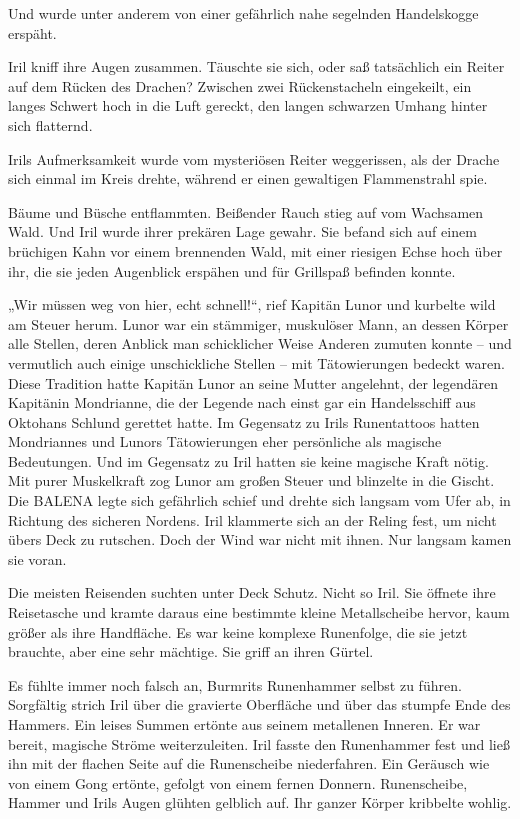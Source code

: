 Und wurde unter anderem von einer gefährlich nahe segelnden Handelskogge erspäht.

Iril kniff ihre Augen zusammen. Täuschte sie sich, oder saß tatsächlich ein Reiter auf dem Rücken des Drachen? Zwischen zwei Rückenstacheln eingekeilt, ein langes Schwert hoch in die Luft gereckt, den langen schwarzen Umhang hinter sich flatternd.

Irils Aufmerksamkeit wurde vom mysteriösen Reiter weggerissen, als der Drache sich einmal im Kreis drehte, während er einen gewaltigen Flammenstrahl spie.

Bäume und Büsche entflammten. Beißender Rauch stieg auf vom Wachsamen Wald. Und Iril wurde ihrer prekären Lage gewahr. Sie befand sich auf einem brüchigen Kahn vor einem brennenden Wald, mit einer riesigen Echse hoch über ihr, die sie jeden Augenblick erspähen und für Grillspaß befinden konnte.

„Wir müssen weg von hier, echt schnell!“, rief Kapitän Lunor und kurbelte wild am Steuer herum. Lunor war ein stämmiger, muskulöser Mann, an dessen Körper alle Stellen, deren Anblick man schicklicher Weise Anderen zumuten konnte – und vermutlich auch einige unschickliche Stellen – mit Tätowierungen bedeckt waren. Diese Tradition hatte Kapitän Lunor an seine Mutter angelehnt, der legendären Kapitänin Mondrianne, die der Legende nach einst gar ein Handelsschiff aus Oktohans Schlund gerettet hatte. Im Gegensatz zu Irils Runentattoos hatten Mondriannes und Lunors Tätowierungen eher persönliche als magische Bedeutungen. Und im Gegensatz zu Iril hatten sie keine magische Kraft nötig. Mit purer Muskelkraft zog Lunor am großen Steuer und blinzelte in die Gischt. Die BALENA legte sich gefährlich schief und drehte sich langsam vom Ufer ab, in Richtung des sicheren Nordens. Iril klammerte sich an der Reling fest, um nicht übers Deck zu rutschen. Doch der Wind war nicht mit ihnen. Nur langsam kamen sie voran.

Die meisten Reisenden suchten unter Deck Schutz. Nicht so Iril. Sie öffnete ihre Reisetasche und kramte daraus eine bestimmte kleine Metallscheibe hervor, kaum größer als ihre Handfläche. Es war keine komplexe Runenfolge, die sie jetzt brauchte, aber eine sehr mächtige. Sie griff an ihren Gürtel.

Es fühlte immer noch falsch an, Burmrits Runenhammer selbst zu führen. Sorgfältig strich Iril über die gravierte Oberfläche und über das stumpfe Ende des Hammers. Ein leises Summen ertönte aus seinem metallenen Inneren. Er war bereit, magische Ströme weiterzuleiten. Iril fasste den Runenhammer fest und ließ ihn mit der flachen Seite auf die Runenscheibe niederfahren. Ein Geräusch wie von einem Gong ertönte, gefolgt von einem fernen Donnern. Runenscheibe, Hammer und Irils Augen glühten gelblich auf. Ihr ganzer Körper kribbelte wohlig.

